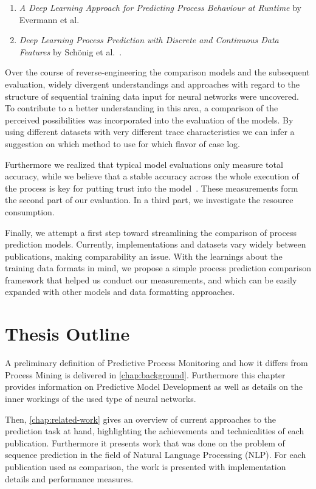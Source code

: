 \begin{enumerate}
    \item \textit{A Deep Learning Approach for Predicting Process Behaviour at Runtime} by Evermann et al.~\cite{evermann2016}
    \item\textit{Deep Learning Process Prediction with Discrete and Continuous Data Features} by Schönig et al.~\cite{schoenig2018}.
\end{enumerate}

Over the course of reverse-engineering the comparison models and the subsequent evaluation, widely divergent understandings and approaches with regard to the structure of sequential training data input for neural networks were uncovered. To contribute to a better understanding in this area, a comparison of the perceived possibilities was incorporated into the evaluation of the models. By using different datasets with very different trace characteristics we can infer a suggestion on which method to use for which flavor of case log.

Furthermore we realized that typical model evaluations only measure total accuracy, while we believe that a stable accuracy across the whole execution of the process is key for putting trust into the model~\cite{francescomarino2015, boehmer2018probability}. These measurements form the second part of our evaluation. In a third part, we investigate the resource consumption.

Finally, we attempt a first step toward streamlining the comparison of process prediction models. Currently, implementations and datasets vary widely between publications, making comparability an issue. With the learnings about the training data formats in mind, we propose a simple process prediction comparison framework that helped us conduct our measurements, and which can be easily expanded with other models and data formatting approaches.

\section{Thesis Outline}\label{sec:intro:outline}
A preliminary definition of Predictive Process Monitoring and how it differs from Process Mining is delivered in \autoref{chap:background}. Furthermore this chapter provides information on Predictive Model Development as well as details on the inner workings of the used type of neural networks.

Then, \autoref{chap:related-work} gives an overview of current approaches to the prediction task at hand, highlighting the achievements and technicalities of each publication. Furthermore it presents work that was done on the problem of sequence prediction in the field of Natural Language Processing (NLP). For each publication used as comparison, the work is presented with implementation details and performance measures.

